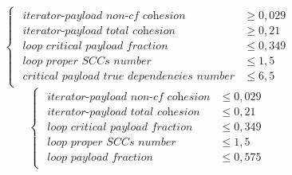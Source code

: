 \begin{equation*}
\begin{cases}
\begin{aligned}
\textit{iterator-payload non-cf cohesion}            &\ge 0,029 \\[1ex]
\textit{iterator-payload total cohesion} &\geq 0,21 \\[1ex]
\textit{loop critical payload fraction} &\leq 0,349 \\[1ex]
\textit{loop proper SCCs number} &\leq 1,5 \\[1ex]
\textit{critical payload true dependencies number} &\leq 6,5
\end{aligned}
\end{cases}
\end{equation*}\newline
\begin{equation*}
\begin{cases}
\begin{aligned}
\textit{iterator-payload non-cf cohesion}            &\le 0,029 \\[1ex]
\textit{iterator-payload total cohesion} &\leq 0,21 \\[1ex]
\textit{loop critical payload fraction} &\leq 0,349 \\[1ex]
\textit{loop proper SCCs number} &\leq 1,5 \\[1ex]
\textit{loop payload fraction} &\leq 0,575
\end{aligned}
\end{cases}
\end{equation*}\newline
    
